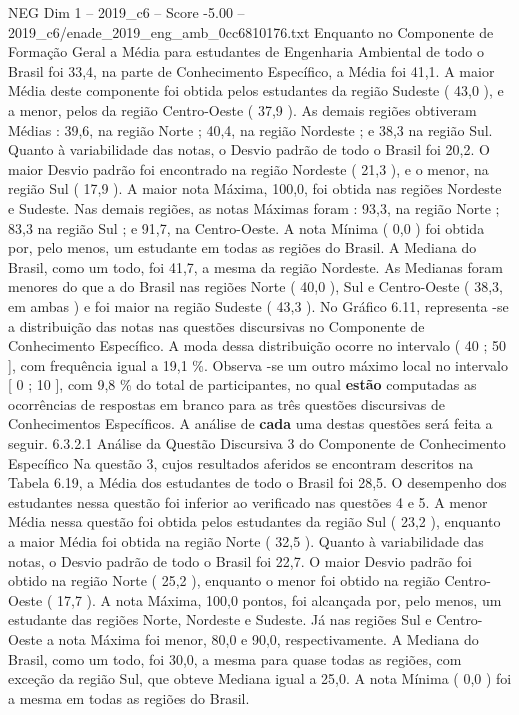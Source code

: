 \begin{textsample}{NEG Dim 1 – 2019\_c6 – Score -5.00 – 2019\_c6/enade\_2019\_eng\_amb\_0cc6810176.txt}
Enquanto no Componente de Formação Geral a Média para estudantes de Engenharia Ambiental de todo o Brasil foi 33,4, na parte de Conhecimento Específico, a Média foi 41,1.
A maior Média deste componente foi obtida pelos estudantes da região Sudeste ( 43,0 ), e a menor, pelos da região Centro-Oeste ( 37,9 ).
As demais regiões obtiveram Médias : 39,6, na região Norte ; 40,4, na região Nordeste ; e 38,3 na região Sul.
Quanto à variabilidade das notas, o Desvio padrão de todo o Brasil foi 20,2.
O maior Desvio padrão foi encontrado na região Nordeste ( 21,3 ), e o menor, na região Sul ( 17,9 ).
A maior nota Máxima, 100,0, foi obtida nas regiões Nordeste e Sudeste.
Nas demais regiões, as notas Máximas foram : 93,3, na região Norte ; 83,3 na região Sul ; e 91,7, na Centro-Oeste.
A nota Mínima ( 0,0 ) foi obtida por, pelo menos, um estudante em todas as regiões do Brasil.
A Mediana do Brasil, como um todo, foi 41,7, a mesma da região Nordeste.
As Medianas foram menores do que a do Brasil nas regiões Norte ( 40,0 ), Sul e Centro-Oeste ( 38,3, em ambas ) e foi maior na região Sudeste ( 43,3 ).
No Gráfico 6.11, representa -se a distribuição das notas nas questões discursivas no Componente de Conhecimento Específico.
A moda dessa distribuição ocorre no intervalo ( 40 ; 50 ], com frequência igual a 19,1 \%.
Observa -se um outro máximo local no intervalo [ 0 ; 10 ], com 9,8 \% do total de participantes, no qual \textbf{estão} computadas as ocorrências de respostas em branco para as três questões discursivas de Conhecimentos Específicos.
A análise de \textbf{cada} uma destas questões será feita a seguir. 6.3.2.1 Análise da Questão Discursiva 3 do Componente de Conhecimento Específico Na questão 3, cujos resultados aferidos se encontram descritos na Tabela 6.19, a Média dos estudantes de todo o Brasil foi 28,5.
O desempenho dos estudantes nessa questão foi inferior ao verificado nas questões 4 e 5.
A menor Média nessa questão foi obtida pelos estudantes da região Sul ( 23,2 ), enquanto a maior Média foi obtida na região Norte ( 32,5 ).
Quanto à variabilidade das notas, o Desvio padrão de todo o Brasil foi 22,7.
O maior Desvio padrão foi obtido na região Norte ( 25,2 ), enquanto o menor foi obtido na região Centro-Oeste ( 17,7 ).
A nota Máxima, 100,0 pontos, foi alcançada por, pelo menos, um estudante das regiões Norte, Nordeste e Sudeste.
Já nas regiões Sul e Centro-Oeste a nota Máxima foi menor, 80,0 e 90,0, respectivamente.
A Mediana do Brasil, como um todo, foi 30,0, a mesma para quase todas as regiões, com exceção da região Sul, que obteve Mediana igual a 25,0.
A nota Mínima ( 0,0 ) foi a mesma em todas as regiões do Brasil.

\end{textsample}
